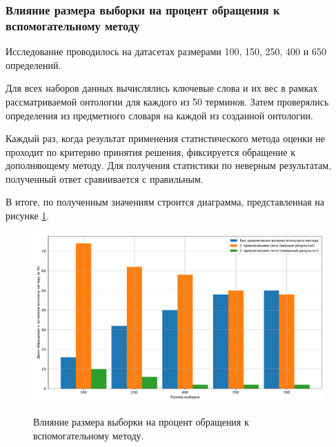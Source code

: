 \subsubsection{Влияние размера выборки на процент обращения к вспомогательному методу}
Исследование проводилось на датасетах размерами 100, 150, 250, 400 и 650 определений. 

Для всех наборов данных вычислялись ключевые слова и их вес в рамках рассматриваемой онтологии для каждого из 50 терминов. Затем проверялись определения из предметного словаря на каждой из созданной онтологии. 

Каждый раз, когда результат применения статистического метода оценки не проходит по критерию принятия решения, фиксируется обращение к дополняющему методу. Для получения статистики по неверным результатам, полученный ответ сравнивается с правильным.

В итоге, по полученным значениям строится диаграмма, представленная на рисунке \ref{fig400:image}.

\begin{figure}[h!]
	\begin{center}
		{\includegraphics[scale = 0.54]{img/research/time3.pdf}}
		\caption{Влияние размера выборки на процент обращения к вспомогательному методу.}
		\label{fig400:image}
	\end{center}
\end{figure}

